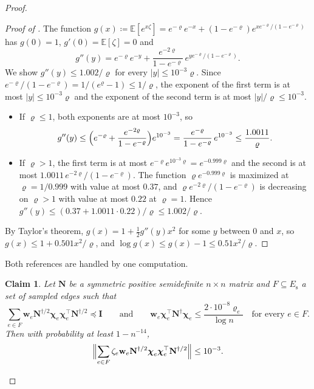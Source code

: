 \documentclass[11pt]{article}
\newtheorem{claim}[theorem]{Claim}
\theoremstyle{remark}
\newcommand{\cchi}{{\boldsymbol\chi}}
\newcommand{\II}{\mathbf I}
\newcommand{\NN}{\mathbf N}
\newcommand{\ww}{\mathbf w}
\newcommand{\defeq}{\coloneqq}
\newcommand{\Ex}{\mathbb E}
\begin{document}
\begin{proof}
\begin{proof}[Proof of ]
The function $g(x)\defeq\Ex[e^{x\zeta}]
=e^{-\varrho}e^{-x}+(1-e^{-\varrho})e^{x e^{-\varrho}/(1-e^{-\varrho})}$
has $g(0)=1$, $g'(0)=\Ex[\zeta]=0$ and
\[
g''(y)=e^{-\varrho}e^{-y}
+\frac{e^{-2\varrho}}{1-e^{-\varrho}}\,e^{y e^{-\varrho}/(1-e^{-\varrho})}.
\]
We show $g''(y)\le1.002/\varrho$ for every $|y|\le10^{-3}\varrho$.
Since $e^{-\varrho}/(1-e^{-\varrho})=1/(e^{\varrho}-1)\le1/\varrho$, the
exponent of the first term is at most $|y|\le10^{-3}\varrho$ and the
exponent of the second term is at most $|y|/\varrho\le10^{-3}$.
\begin{itemize}[leftmargin=*]
\item If $\varrho\le1$, both exponents are at most $10^{-3}$, so
\[
g''(y)\le\Bigl(e^{-\varrho}+\frac{e^{-2\varrho}}{1-e^{-\varrho}}\Bigr)
e^{10^{-3}}
=\frac{e^{-\varrho}}{1-e^{-\varrho}}\,e^{10^{-3}}
\le\frac{1.0011}{\varrho}.
\]
\item If $\varrho>1$, the first term is at most
$e^{-\varrho}e^{10^{-3}\varrho}=e^{-0.999\varrho}$ and the second is at most
$1.0011\,e^{-2\varrho}/(1-e^{-\varrho})$.
The function $\varrho e^{-0.999\varrho}$ is maximized at $\varrho=1/0.999$
with value at most $0.37$, and $\varrho e^{-2\varrho}/(1-e^{-\varrho})$ is
decreasing on $\varrho>1$ with value at most $0.22$ at $\varrho=1$.
Hence $g''(y)\le(0.37+1.0011\cdot0.22)/\varrho\le1.002/\varrho$.
\end{itemize}
By Taylor's theorem, $g(x)=1+\frac12g''(y)x^{2}$ for some $y$ between $0$
and $x$, so $g(x)\le1+0.501x^{2}/\varrho$, and
$\log g(x)\le g(x)-1\le0.51x^{2}/\varrho$.
\end{proof}

Both references are handled by one computation.

\begin{claim}\label{clm:bernoulli-generic}
Let $\NN$ be a symmetric positive semidefinite $n\times n$ matrix and
$F\subseteq E_{\mathrm{s}}$ a set of sampled edges such that
\[
\sum_{e\in F}\ww_e\NN^{\dag/2}\cchi_e\cchi_e^{\top}\NN^{\dag/2}\preceq\II
\qquad\text{and}\qquad
\ww_e\cchi_e^{\top}\NN^{\dag}\cchi_e\le\frac{2\cdot10^{-8}\varrho_e}{\log n}
\quad\text{for every }e\in F .
\]
Then with probability at least $1-n^{-14}$,
\[
\Bigl\lVert\sum_{e\in F}\zeta_e\ww_e\NN^{\dag/2}\cchi_e\cchi_e^{\top}
\NN^{\dag/2}\Bigr\rVert\le10^{-3}.
\]
\end{claim}


\end{proof}
\end{document}
